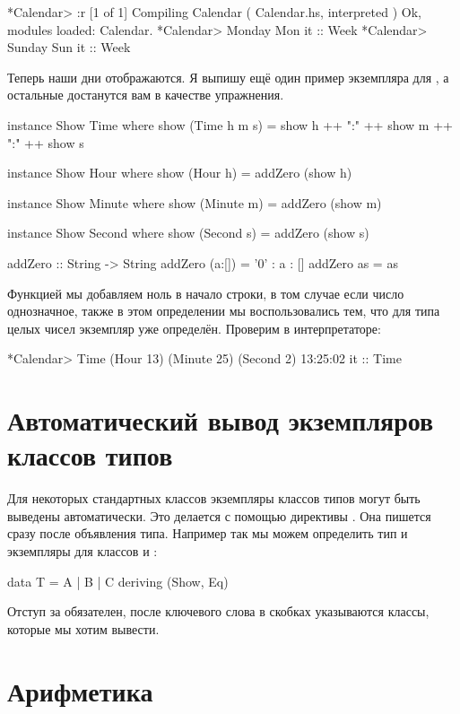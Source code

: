 \begin{code}
*Calendar> :r
[1 of 1] Compiling Calendar         ( Calendar.hs, interpreted )
Ok, modules loaded: Calendar.
*Calendar> Monday
Mon
it :: Week
*Calendar> Sunday
Sun
it :: Week
\end{code}

Теперь наши дни отображаются. Я выпишу ещё один пример экземпляра
для , а остальные достанутся вам в качестве упражнения.

\begin{code}
instance Show Time where
    show (Time h m s) = show h ++ ":" ++ show m ++ ":" ++ show s

instance Show Hour where
    show (Hour h) = addZero (show h)

instance Show Minute where
    show (Minute m) = addZero (show m)

instance Show Second where
    show (Second s) = addZero (show s)

addZero :: String -> String
addZero (a:[]) = '0' : a : []
addZero as     = as
\end{code}

Функцией  мы добавляем ноль в начало строки, 
в том случае если число однозначное, также в этом определении
мы воспользовались тем, что для типа целых чисел 
 экземпляр  уже определён. Проверим в интерпретаторе:

\begin{code}
*Calendar> Time (Hour 13) (Minute 25) (Second 2)
13:25:02
it :: Time
\end{code}

\section{Автоматический вывод экземпляров классов типов}

Для некоторых стандартных классов экземпляры классов
типов могут быть выведены автоматически. Это делается
с помощью директивы  . Она пишется сразу
после объявления типа. Например так мы можем определить
тип и экземпляры для классов  и :

\begin{code}
data T = A | B | C
    deriving (Show, Eq)
\end{code}

Отступ за  обязателен, после ключевого
слова в скобках указываются классы, которые мы хотим вывести.

\section{Арифметика}

